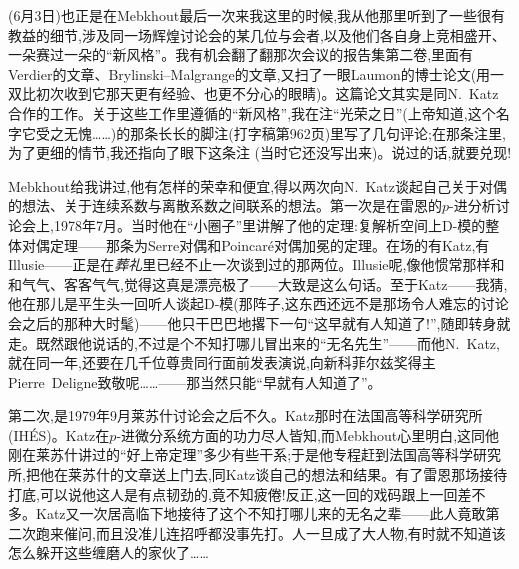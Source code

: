 (6月3日)也正是在Mebkhout最后一次来我这里的时候,我从他那里听到了一些很有教益的细节,涉及同一场辉煌讨论会的某几位与会者,以及他们各自身上竞相盛开、一朵赛过一朵的“新风格”。我有机会翻了翻那次会议的报告集第二卷,里面有Verdier的文章、Brylinski--Malgrange的文章,又扫了一眼Laumon的博士论文(用一双比初次收到它那天更有经验、也更不分心的眼睛)。这篇论文其实是同N.~Katz合作的工作。关于这些工作里遵循的“新风格”,我在注“光荣之日”(上帝知道,这个名字它受之无愧……)的那条长长的脚注(打字稿第962页)里写了几句评论;在那条注里,为了更细的情节,我还指向了眼下这条注
(当时它还没写出来)。说过的话,就要兑现!

Mebkhout给我讲过,他有怎样的荣幸和便宜,得以两次向N.~Katz谈起自己关于对偶的想法、关于连续系数与离散系数之间联系的想法。第一次是在雷恩的$p$-进分析讨论会上,1978年7月。当时他\dmark{}在“小圈子”里讲解了他的定理:复解析空间上D-模的整体对偶定理——那条为Serre对偶和Poincaré对偶加冕的定理。在场的有Katz,有Illusie——正是在\emph{葬礼}里已经不止一次谈到过的那两位。Illusie呢,像他惯常那样和和气气、客客气气,觉得这真是漂亮极了——大致是这么句话。至于Katz——我猜,他在那儿是平生头一回听人谈起D-模(那阵子,这东西还远不是那场令人难忘的讨论会之后的那种大时髦)——他只干巴巴地撂下一句“这早就有人知道了!”,随即转身就走。既然跟他说话的,不过是个不知打哪儿冒出来的“无名先生”——而他N.~Katz,就在同一年,还要在几千位尊贵同行面前发表演说,向新科菲尔兹奖得主Pierre~Deligne致敬呢……——那当然只能“早就有人知道了”。

第二次,是1979年9月莱苏什讨论会之后不久。Katz那时在法国高等科学研究所(IHÉS)。Katz在$p$-进微分系统方面的功力尽人皆知,而Mebkhout心里明白,这同他刚在莱苏什讲过的“好上帝定理”多少有些干系;于是他专程赶到法国高等科学研究所,把他在莱苏什的文章送上门去,同Katz谈自己的想法和结果。有了雷恩那场接待打底,可以说他这人是有点韧劲的,竟不知疲倦!反正,这一回的戏码跟上一回差不多。Katz又一次居高临下地接待了这个不知打哪儿来的无名之辈——此人竟敢第二次跑来催问,而且没准儿连招呼都没事先打。人一旦成了大人物,有时就不知道该怎么躲开这些缠磨人的家伙了……

